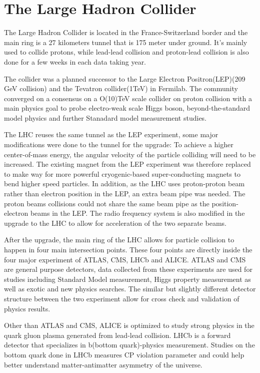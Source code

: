 
\section{The Large Hadron Collider}
\label{LHC}

The Large Hadron Collider is located in the France-Switzerland border and the main ring is a 27 kilometers tunnel that is 175 meter under ground. It's mainly used to collide protons, while lead-lead collision and proton-lead collision is also done for a few weeks in each data taking year. 


The collider was a planned successor to the Large Electron Positron(LEP)(209 GeV collision) and the Tevatron collider(1TeV) in Fermilab. The community converged on a consensus on a O(10)TeV scale collider on proton collision with a main physics goal to probe electro-weak scale Higgs boson, beyond-the-standard model physics and further Stanadard model measurement studies.

The LHC reuses the same tunnel as the LEP experiment, some major modifications were done to the tunnel for the upgrade: To achieve a higher center-of-mass energy, the angular velocity of the particle colliding will need to be increased. The existing magnet from the LEP experiment was therefore replaced to make way for more powerful cryogenic-based super-conducting magnets to bend higher speed particles. In addition, as the LHC uses proton-proton beam rather than electron position in the LEP, an
extra beam pipe was needed. The proton beams collisions could not share the same beam pipe as the position-electron beams in the LEP. The radio frequency system is also modified in the upgrade to the LHC to allow for acceleration of the two separate beams. 


After the upgrade, the main ring of the LHC allows for particle collision to happen in four main intersection points. These four points are directly inside the four major experiment of ATLAS, CMS, LHCb and ALICE. 
ATLAS and CMS are general purpose detectors, data collected from these experiments are used for studies including Standard Model measurement, Higgs property measurement as well as exotic and new physics searches. The similar but slightly different detector structure between the two experiment allow for cross check
and validation of physics results.

Other than ATLAS and CMS, ALICE is optimized to study strong physics in the quark gluon plasma generated from lead-lead collision. LHCb is a forward detector that specializes in b(bottom quark)-physics measurement. Studies on the bottom quark done in LHCb measures CP violation parameter and could help better understand matter-antimatter asymmetry of the universe. 

